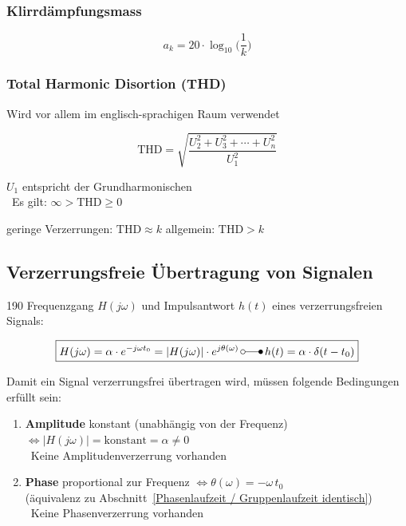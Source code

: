 \subsubsection{Klirrdämpfungsmass}
$$ \boxed{ a_k = 20 \cdot \log_{10} \Big( \frac{1}{k}  \Big)  } $$


\subsubsection{Total Harmonic Disortion (THD)}
Wird vor allem im englisch-sprachigen Raum verwendet

\begin{minipage}[b]{0.48\columnwidth}
   $$ \boxed{  \text{THD} = \sqrt{\frac{U_2^2 + U_3^2 + \cdots + U_n^2}{U_1^2} } } $$
\end{minipage}
\hfill
\begin{minipage}[c]{0.48\columnwidth}
    \raggedright%
    $U_1$ entspricht der Grundharmonischen\\
    \textrightarrow\ Es gilt:  $\infty > \text{THD} \geq 0$ 
\end{minipage}

\vspace{0.2cm}
geringe Verzerrungen: $\text{THD} \approx k$ \qquad allgemein: $\text{THD} > k$


\subsection{Verzerrungsfreie Übertragung von Signalen}{190}
Frequenzgang $H(j \omega)$ und Impulsantwort $h(t)$ eines verzerrungsfreien Signals:

$$ \boxed{ H(j \omega) = \alpha \cdot e^{- j \omega t_0} = | H(j \omega)|  \cdot e^{j \theta(\omega)}  \, \laplace \,  h(t) = \alpha \cdot \delta(t - t_0) } $$


Damit ein Signal verzerrungsfrei übertragen wird, müssen folgende Bedingungen erfüllt sein:

\begin{enumerate}
    \item \textbf{Amplitude} konstant (unabhängig von der Frequenz) $\Leftrightarrow | H(j \omega)| = \text{konstant} = \alpha \neq 0$\\
        \textrightarrow\ Keine Amplitudenverzerrung vorhanden
    \item \textbf{Phase} proportional zur Frequenz $\Leftrightarrow \theta(\omega) = - \omega \, t_0$\\
        (äquivalenz zu Abschnitt\ \ref{Phasenlaufzeit / Gruppenlaufzeit identisch})
        \textrightarrow\ Keine Phasenverzerrung vorhanden
\end{enumerate}


